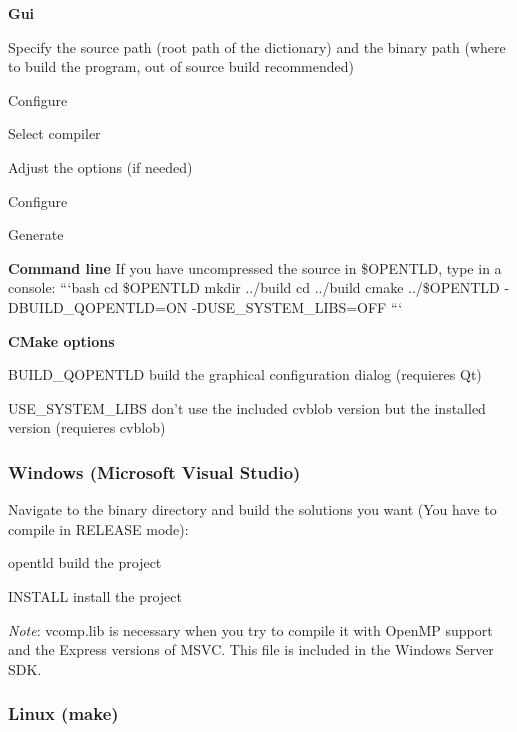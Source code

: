 {\bfseries Gui}
\begin{DoxyItemize}
\item Specify the source path (root path of the dictionary) and the binary path (where to build the program, out of source build recommended)
\item Configure
\item Select compiler
\item Adjust the options (if needed)
\item Configure
\item Generate
\end{DoxyItemize}

{\bfseries Command line} If you have uncompressed the source in \$\-O\-P\-E\-N\-T\-L\-D, type in a console\-: ```bash cd \$\-O\-P\-E\-N\-T\-L\-D mkdir ../build cd ../build cmake ../\$\-O\-P\-E\-N\-T\-L\-D -\/\-D\-B\-U\-I\-L\-D\-\_\-\-Q\-O\-P\-E\-N\-T\-L\-D=O\-N -\/\-D\-U\-S\-E\-\_\-\-S\-Y\-S\-T\-E\-M\-\_\-\-L\-I\-B\-S=O\-F\-F ```

{\bfseries C\-Make options}
\begin{DoxyItemize}
\item {\ttfamily B\-U\-I\-L\-D\-\_\-\-Q\-O\-P\-E\-N\-T\-L\-D} build the graphical configuration dialog (requieres Qt)
\item {\ttfamily U\-S\-E\-\_\-\-S\-Y\-S\-T\-E\-M\-\_\-\-L\-I\-B\-S} don't use the included cvblob version but the installed version (requieres cvblob)
\end{DoxyItemize}

\subsubsection*{Windows (Microsoft Visual Studio)}

Navigate to the binary directory and build the solutions you want (You have to compile in R\-E\-L\-E\-A\-S\-E mode)\-:
\begin{DoxyItemize}
\item {\ttfamily opentld} build the project
\item {\ttfamily I\-N\-S\-T\-A\-L\-L} install the project
\end{DoxyItemize}

{\itshape Note}\-: {\ttfamily vcomp.\-lib} is necessary when you try to compile it with Open\-M\-P support and the Express versions of M\-S\-V\-C. This file is included in the Windows Server S\-D\-K.

\subsubsection*{Linux (make)}

